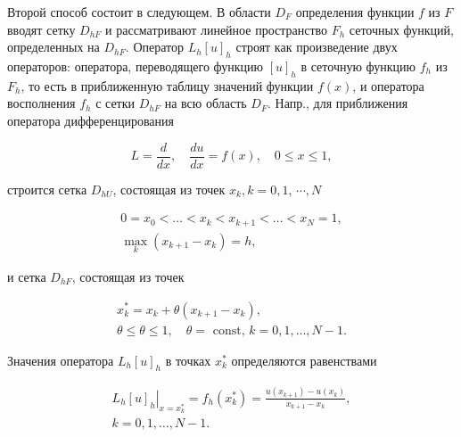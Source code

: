 \documentclass[10pt]{article}
\begin{document}
Второй способ состоит в следующем. В области $D_{F}$ определения функции $f$ из $F$ вводят сетку $D_{h F}$ и рассматривают линейное пространство $F_{h}$ сеточных функций, определенных на $D_{h F}$. Оператор $L_{h}[u]_{h}$ строят как произведение двух операторов: оператора, переводящего функцию $[u]_{h}$ в сеточную функцию $f_{h}$ из $F_{h}$, то есть в приближенную таблицу значений функции $f(x)$, и оператора восполнения $f_{h}$ с сетки $D_{h F}$ на всю область $D_{F}$. Напр., для приближения оператора дифференцирования



\[

L=\frac{d}{d x}, \quad \frac{d u}{d x}=f(x), \quad 0 \leqslant x \leqslant 1,

\]



строится сетка $D_{h U}$, состоящая из точек $x_{k}, k=0,1$, $\cdots, N$



\[

\begin{gathered}

0=x_{0}<\ldots<x_{k}<x_{k+1}<\ldots<x_{N}=1, \\

\max _{k}\left(x_{k+1}-x_{k}\right)=h,

\end{gathered}

\]



и сетка $D_{h F}$, состоящая из точек



\[

\begin{gathered}

x_{k}^{*}=x_{k}+\theta\left(x_{k+1}-x_{k}\right), \\

\theta \leqslant \theta \leqslant 1, \quad \theta=\text { const, } k=0,1, \ldots, N-1 .

\end{gathered}

\]



Значения оператора $L_{h}[u]_{h}$ в точках $x_{k}^{*}$ определяются равенствами



\[

\begin{gathered}

\left.L_{h}[u]_{h}\right|_{x=x_{k}^{*}}=f_{h}\left(x_{k}^{*}\right)=\frac{u\left(x_{k+1}\right)-u\left(x_{k}\right)}{x_{k+1}-x_{k}}, \\

k=0,1, \ldots, N-1 .

\end{gathered}

\]
\end{document}
